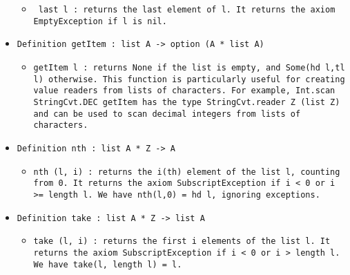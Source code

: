 \documentclass[11pt]{report}
\begin{document}
\begin{itemize}
\begin{itemize}
\item  \begin{flushleft} \texttt{ last l : returns the last element of l. It returns the axiom EmptyException if l is nil.} \end{flushleft}
\end{itemize}

\item  \texttt{Definition getItem : list A -> option (A * list A)}

\begin{itemize}
\item  \begin{flushleft} \texttt{getItem l : returns None if the list is empty, and Some(hd l,tl l) otherwise. This function is particularly useful for creating value readers from lists of characters. For example, Int.scan StringCvt.DEC getItem has the type StringCvt.reader Z (list Z) and can be used to scan decimal integers from lists of characters. } \end{flushleft}



\end{itemize}

\item  \texttt{Definition nth : list A * Z -> A}

\begin{itemize}
\item  \begin{flushleft} \texttt{nth (l, i) : returns the i(th) element of the list l, counting from 0. It returns the axiom SubscriptException if i < 0 or i >= length l. We have nth(l,0) = hd l, ignoring exceptions. } \end{flushleft}



\end{itemize}

\item  \texttt{Definition take : list A * Z -> list A}

\begin{itemize}
\item  \begin{flushleft} \texttt{take (l, i) : returns the first i elements of the list l. It returns the axiom SubscriptException if i < 0 or i > length l. We have take(l, length l) = l.} \end{flushleft}




\end{itemize}
\end{itemize}
\end{document}
